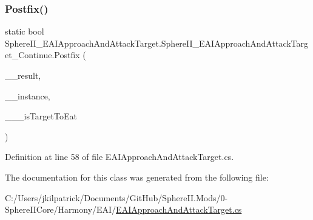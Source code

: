 \subsubsection{\texorpdfstring{Postfix()}{Postfix()}}
{\footnotesize\ttfamily static bool Sphere\+I\+I\+\_\+\+E\+A\+I\+Approach\+And\+Attack\+Target.\+Sphere\+I\+I\+\_\+\+E\+A\+I\+Approach\+And\+Attack\+Target\+\_\+\+Continue.\+Postfix (\begin{DoxyParamCaption}\item[{bool}]{\+\_\+\+\_\+result,  }\item[{E\+A\+I\+Approach\+And\+Attack\+Target}]{\+\_\+\+\_\+instance,  }\item[{ref bool}]{\+\_\+\+\_\+\+\_\+is\+Target\+To\+Eat }\end{DoxyParamCaption})\hspace{0.3cm}{\ttfamily [static]}}



Definition at line 58 of file E\+A\+I\+Approach\+And\+Attack\+Target.\+cs.



The documentation for this class was generated from the following file\+:\begin{DoxyCompactItemize}
\item 
C\+:/\+Users/jkilpatrick/\+Documents/\+Git\+Hub/\+Sphere\+I\+I.\+Mods/0-\/\+Sphere\+I\+I\+Core/\+Harmony/\+E\+A\+I/\mbox{\hyperlink{_e_a_i_approach_and_attack_target_8cs}{E\+A\+I\+Approach\+And\+Attack\+Target.\+cs}}\end{DoxyCompactItemize}
